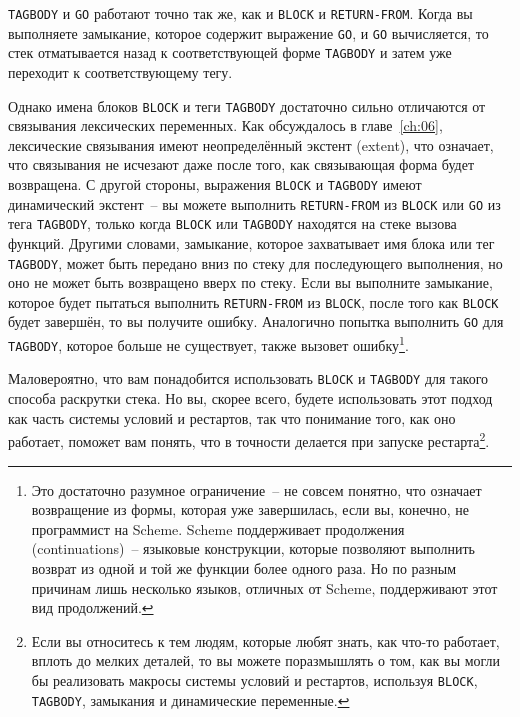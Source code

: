 \lstinline{TAGBODY} и \lstinline{GO} работают точно так же, как и \lstinline{BLOCK} и \lstinline{RETURN-FROM}.
Когда вы выполняете замыкание, которое содержит выражение \lstinline{GO}, и \lstinline{GO}
вычисляется, то стек отматывается назад к соответствующей форме \lstinline{TAGBODY} и затем
уже переходит к соответствующему тегу.

Однако имена блоков \lstinline{BLOCK} и теги \lstinline{TAGBODY} достаточно сильно отличаются от
связывания лексических переменных. Как обсуждалось в главе~\ref{ch:06}, лексические
связывания имеют неопределённый экстент (extent), что означает, что связывания не
исчезают даже после того, как связывающая форма будет возвращена. С другой стороны,
выражения \lstinline{BLOCK} и \lstinline{TAGBODY} имеют динамический экстент~-- вы можете выполнить
\lstinline{RETURN-FROM} из \lstinline{BLOCK} или \lstinline{GO} из тега \lstinline{TAGBODY}, только когда
\lstinline{BLOCK} или \lstinline{TAGBODY} находятся на стеке вызова функций. Другими словами,
замыкание, которое захватывает имя блока или тег \lstinline{TAGBODY}, может быть передано вниз
по стеку для последующего выполнения, но оно не может быть возвращено вверх по
стеку. Если вы выполните замыкание, которое будет пытаться выполнить \lstinline{RETURN-FROM} из
\lstinline{BLOCK}, после того как \lstinline{BLOCK} будет завершён, то вы получите
ошибку. Аналогично попытка выполнить \lstinline{GO} для \lstinline{TAGBODY}, которое больше не
существует, также вызовет ошибку\footnote{Это достаточно разумное ограничение~-- не
  совсем понятно, что означает возвращение из формы, которая уже завершилась, если вы,
  конечно, не программист на Scheme. Scheme поддерживает продолжения (continuations)~--
  языковые конструкции, которые позволяют выполнить возврат из одной и той же функции
  более одного раза. Но по разным причинам лишь несколько языков, отличных от Scheme,
  поддерживают этот вид продолжений.}.

Маловероятно, что вам понадобится использовать \lstinline{BLOCK} и \lstinline{TAGBODY} для такого
способа раскрутки стека.  Но вы, скорее всего, будете использовать этот подход как часть
системы условий и рестартов, так что понимание того, как оно работает, поможет вам понять,
что в точности делается при запуске рестарта\footnote{Если вы относитесь к тем людям,
  которые любят знать, как что-то работает, вплоть до мелких деталей, то вы можете
  поразмышлять о том, как вы могли бы реализовать макросы системы условий и рестартов,
  используя \lstinline{BLOCK}, \lstinline{TAGBODY}, замыкания и динамические переменные.}.

